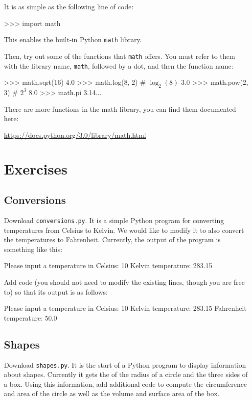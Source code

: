 \documentclass[11pt]{cselabheader}
\begin{document}
It is as simple as the following line of code:

\begin{pyconcode}
>>> import math
\end{pyconcode}

This enables the built-in Python \texttt{math} library.

Then, try out some of the functions that \texttt{math} offers. You must refer to
them with the library name, \texttt{math}, followed by a dot, and then the
function name:

\begin{pyconcode}
>>> math.sqrt(16)
4.0
>>> math.log(8, 2) # $\log_2(8)$
3.0
>>> math.pow(2, 3) # $2^3$
8.0
>>> math.pi
3.14...
\end{pyconcode}

There are more functions in the math library, you can find them documented here:
\begin{center}
\url{https://docs.python.org/3.0/library/math.html}
\end{center}

\pagebreak

\section{Exercises}
\subsection{Conversions}
Download \texttt{conversions.py}. It is a simple Python program for converting
temperatures from Celsius to Kelvin. We would like to modify it to also convert
the temperatures to Fahrenheit. Currently, the output of the program is
something like this:

\begin{verbatimcode}
Please input a temperature in Celsius: 10
Kelvin temperature: 283.15
\end{verbatimcode}

Add code (you should not need to modify the existing lines, though you are free
to) so that its output is as follows:

\begin{verbatimcode}
Please input a temperature in Celsius: 10
Kelvin temperature: 283.15
Fahrenheit temperature: 50.0
\end{verbatimcode}

\subsection{Shapes}
Download \texttt{shapes.py}. It is the start of a Python program to display
information about shapes. Currently it gets the of the radius of a circle and
the three sides of a box. Using this information, add additional code to compute
the circumference and area of the circle as well as the volume and surface area
of the box.
\end{document}
